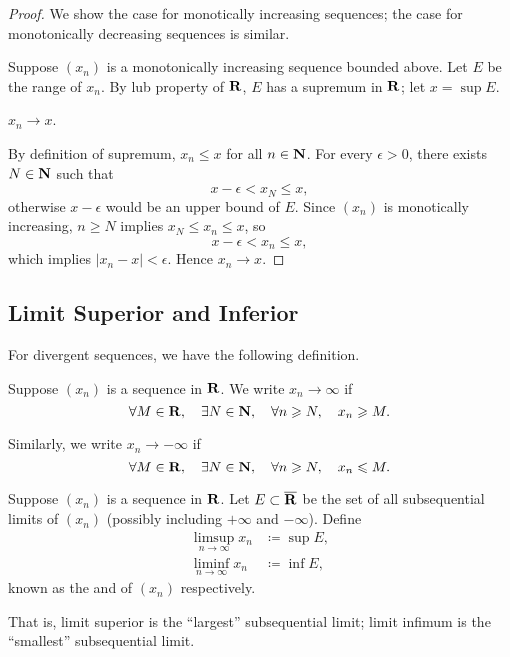 \begin{proof}
We show the case for monotically increasing sequences; the case for monotonically decreasing sequences is similar.

\fbox{$\impliedby$} Suppose $(x_n)$ is a monotonically increasing sequence bounded above. Let $E$ be the range of $x_n$. By lub property of $\mathbf R$, $E$ has a supremum in $\mathbf R$; let $x=\sup E$.
\begin{claim}
$x_n\to x$.
\end{claim}
By definition of supremum, $x_n\le x$ for all $n\in\mathbf N$. For every $\epsilon>0$, there exists $N\in\mathbf N$ such that
\[x-\epsilon<x_N\le x,\]
otherwise $x-\epsilon$ would be an upper bound of $E$. Since $(x_n)$ is monotically increasing, $n\ge N$ implies $x_N\le x_n\le x$, so 
\[x-\epsilon<x_n\le x,\]
which implies $|x_n-x|<\epsilon$. Hence $x_n\to x$.
\end{proof}

\subsection{Limit Superior and Inferior}
For divergent sequences, we have the following definition.
\begin{definition}
Suppose $(x_n)$ is a sequence in $\mathbf R$. We write $x_n\to\infty$ if
\[\forall M\in\mathbf R,\quad\exists N\in\mathbf N,\quad\forall n\geqslant N,\quad x_n\geqslant M.\]

Similarly, we write $x_n\to-\infty$ if 
\[\forall M\in\mathbf R,\quad\exists N\in\mathbf N,\quad\forall n\geqslant N,\quad x_n\leqslant M.\]
\end{definition}

\begin{definition}
Suppose $(x_n)$ is a sequence in $\mathbf R$. Let $E\subset\overline{\mathbf R}$ be the set of all subsequential limits of $(x_n)$ (possibly including $+\infty$ and $-\infty$). Define 
\begin{align*}
\limsup_{n\to\infty}x_n&\coloneqq\sup E,\\
\liminf_{n\to\infty}x_n&\coloneqq\inf E,
\end{align*}
known as the  and  of $(x_n)$ respectively.
\end{definition}

\begin{remark}
That is, limit superior is the ``largest'' subsequential limit; limit infimum is the ``smallest'' subsequential limit. 
\end{remark}

